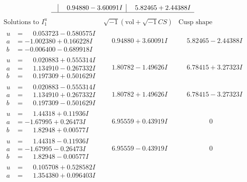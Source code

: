 \documentclass[1p]{elsarticle_modified}
\theoremstyle{definition}
\newcommand{\I}{\sqrt{-1}}
\begin{document}
$$\begin{array}{c|c|c}
 & \phantom{-}0.94880 - 3.60091 I & \phantom{-}5.82465 + 2.44388 I\\
 \hline 
 \end{array}$$\newpage$$\begin{array}{c|c|c}  
\text{Solutions to }I^u_{1}& \I (\text{vol} + \sqrt{-1}CS) & \text{Cusp shape}\\
 \hline 
\begin{aligned}
u &= \phantom{-}0.053723 - 0.580575 I \\
a &= -1.002380 + 0.166228 I \\
b &= -0.006400 - 0.689918 I\end{aligned}
 & \phantom{-}0.94880 + 3.60091 I & \phantom{-}5.82465 - 2.44388 I \\ \hline\begin{aligned}
u &= \phantom{-}0.020883 + 0.555314 I \\
a &= \phantom{-}1.134910 - 0.267332 I \\
b &= \phantom{-}0.197309 + 0.501629 I\end{aligned}
 & \phantom{-}1.80782 - 1.49626 I & \phantom{-}6.78415 + 3.27323 I \\ \hline\begin{aligned}
u &= \phantom{-}0.020883 - 0.555314 I \\
a &= \phantom{-}1.134910 + 0.267332 I \\
b &= \phantom{-}0.197309 - 0.501629 I\end{aligned}
 & \phantom{-}1.80782 + 1.49626 I & \phantom{-}6.78415 - 3.27323 I \\ \hline\begin{aligned}
u &= \phantom{-}1.44318 + 0.11936 I \\
a &= -1.67995 + 0.26473 I \\
b &= \phantom{-}1.82948 + 0.00577 I\end{aligned}
 & \phantom{-}6.95559 + 0.43919 I & \phantom{-0.000000 } 0 \\ \hline\begin{aligned}
u &= \phantom{-}1.44318 - 0.11936 I \\
a &= -1.67995 - 0.26473 I \\
b &= \phantom{-}1.82948 - 0.00577 I\end{aligned}
 & \phantom{-}6.95559 - 0.43919 I & \phantom{-0.000000 } 0 \\ \hline\begin{aligned}
u &= \phantom{-}0.105708 + 0.528582 I \\
a &= \phantom{-}1.354380 + 0.096403 I \\

\end{aligned}
\end{array}$$
\end{document}

